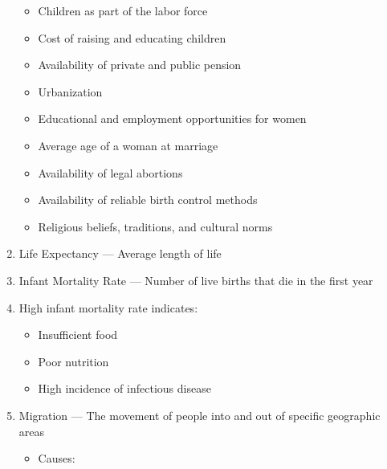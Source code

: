 \documentclass[12pt]{article}
\begin{document}
\begin{enumerate}
\begin{itemize}
      \item Children as part of the labor force

      \item Cost of raising and educating children

      \item Availability of private and public pension

      \item Urbanization

      \item Educational and employment opportunities for women

      \item Average age of a woman at marriage

      \item Availability of legal abortions

      \item Availability of reliable birth control methods

      \item Religious beliefs, traditions, and cultural norms

    \end{itemize}

  \item Life Expectancy — Average length of life

  \item Infant Mortality Rate — Number of live births that die in the first year


  \item High infant mortality rate indicates:

    \begin{itemize}

      \item Insufficient food

      \item Poor nutrition

      \item High incidence of infectious disease

    \end{itemize}

  \item Migration — The movement of people into and out of specific geographic areas

    \begin{itemize}

      \item Causes:


\end{itemize}
\end{enumerate}
\end{document}
